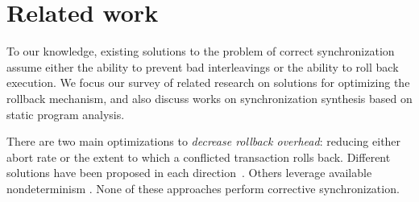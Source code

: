 \section{Related work}
To our knowledge, existing solutions to the problem of correct synchronization assume either the ability to prevent bad interleavings or the ability to roll back execution. We focus our survey of related research on solutions for optimizing the rollback mechanism, and also discuss works on synchronization synthesis based on static program analysis.

There are two main optimizations to \emph{decrease rollback overhead}:
reducing either abort rate or the extent to which a conflicted
transaction rolls back. Different solutions have been proposed in
each direction~\cite{ppopp/HerlihyK08,Galois,TYFS:OOPSLA11}.
Others leverage available nondeterminism
\cite{TKS:OOPSLA13}. None of these approaches perform corrective
synchronization.
%
%
%
%
%

